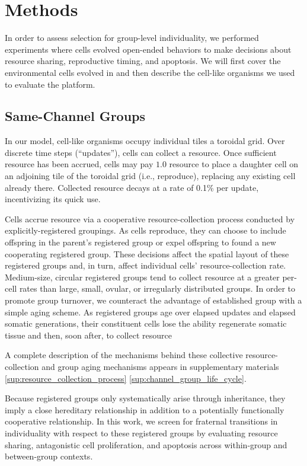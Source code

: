 \section{Methods}

In order to assess selection for group-level individuality, we performed experiments where cells evolved open-ended behaviors to make decisions about resource sharing, reproductive timing, and apoptosis.
We will first cover the environmental cells evolved in and then describe the cell-like organisms we used to evaluate the platform.

\subsection{Same-Channel Groups}

In our model, cell-like organisms occupy individual tiles a toroidal grid.
Over discrete time steps (``updates''), cells can collect a resource.
Once sufficient resource has been accrued, cells may pay $1.0$ resource to place a daughter cell on an adjoining tile of the toroidal grid (i.e., reproduce), replacing any existing cell already there.
Collected resource decays at a rate of 0.1\% per update, incentivizing its quick use.

Cells accrue resource via a cooperative resource-collection process conducted by explicitly-registered groupings.
As cells reproduce, they can choose to include offspring in the parent's registered group or expel offspring to found a new cooperating registered group.
These decisions affect the spatial layout of these registered groups and, in turn, affect individual cells' resource-collection rate.
Medium-size, circular registered groups tend to collect resource at a greater per-cell rates than large, small, ovular, or irregularly distributed groups.
In order to promote group turnover, we counteract the advantage of established group with a simple aging scheme.
As registered groups age over elapsed updates and elapsed somatic generations, their constituent cells lose the ability regenerate somatic tissue and then, soon after, to collect resource

A complete description of the mechanisms behind these collective resource-collection and group aging mechanisms appears in supplementary materials \ref{sup:resource_collection_process} \ref{sup:channel_group_life_cycle}.

Because registered groups only systematically arise through inheritance, they imply a close hereditary relationship in addition to a potentially functionally cooperative relationship.
In this work, we screen for fraternal transitions in individuality with respect to these registered groups by evaluating resource sharing, antagonistic cell proliferation, and apoptosis across within-group and between-group contexts.

